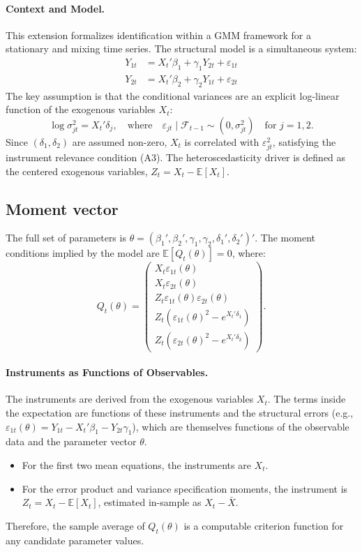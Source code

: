 \documentclass{article}
\newcommand{\E}{\mathbb{E}}
\theoremstyle{plain}
\begin{document}
\paragraph{Context and Model.} This extension formalizes identification within a GMM framework for a stationary and mixing time series. The structural model is a simultaneous system:
\begin{align*}
Y_{1t} &= X_t'\beta_1 + \gamma_1 Y_{2t} + \varepsilon_{1t} \\
Y_{2t} &= X_t'\beta_2 + \gamma_2 Y_{1t} + \varepsilon_{2t}
\end{align*}
The key assumption is that the conditional variances are an explicit log-linear function of the exogenous variables \(X_t\):
\[
\log\sigma_{jt}^2 = X_t'\delta_j, \quad \text{where} \quad \varepsilon_{jt}\mid\mathcal{F}_{t-1}\sim(0,\sigma_{jt}^2) \quad \text{for } j=1,2.
\]
Since \((\delta_1,\delta_2)\) are assumed non-zero, \(X_t\) is correlated with \(\varepsilon_{jt}^2\), satisfying the instrument relevance condition (A3). The heteroscedasticity driver is defined as the centered exogenous variables, \(Z_t = X_t - \E[X_t]\).

\subsection{Moment vector}
The full set of parameters is \(\theta=(\beta_1',\beta_2',\gamma_1,\gamma_2,\delta_1',\delta_2')'\). The moment conditions implied by the model are \(\E[Q_t(\theta)]=0\), where:
\[
Q_t(\theta)=
\begin{pmatrix}
X_t\varepsilon_{1t}(\theta)\\[2pt]
X_t\varepsilon_{2t}(\theta)\\[2pt]
Z_t\varepsilon_{1t}(\theta)\varepsilon_{2t}(\theta)\\[2pt]
Z_t\!\left(\varepsilon_{1t}(\theta)^2-e^{X_t'\delta_1}\right)\\[2pt]
Z_t\!\left(\varepsilon_{2t}(\theta)^2-e^{X_t'\delta_2}\right)
\end{pmatrix}.
\]
\paragraph{Instruments as Functions of Observables.} The instruments are derived from the exogenous variables \(X_t\). The terms inside the expectation are functions of these instruments and the structural errors (e.g., \(\varepsilon_{1t}(\theta) = Y_{1t} - X_t'\beta_1 - Y_{2t}\gamma_1\)), which are themselves functions of the observable data and the parameter vector \(\theta\).
\begin{itemize}
    \item For the first two mean equations, the instruments are \(X_t\).
    \item For the error product and variance specification moments, the instrument is \(Z_t = X_t - \E[X_t]\), estimated in-sample as \(X_t - \bar{X}\).
\end{itemize}
Therefore, the sample average of \(Q_t(\theta)\) is a computable criterion function for any candidate parameter values.
\end{document}
